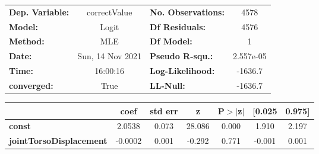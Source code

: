 \begin{center}
\begin{tabular}{lclc}
\toprule
\textbf{Dep. Variable:}         &   correctValue   & \textbf{  No. Observations:  } &     4578    \\
\textbf{Model:}                 &      Logit       & \textbf{  Df Residuals:      } &     4576    \\
\textbf{Method:}                &       MLE        & \textbf{  Df Model:          } &        1    \\
\textbf{Date:}                  & Sun, 14 Nov 2021 & \textbf{  Pseudo R-squ.:     } & 2.557e-05   \\
\textbf{Time:}                  &     16:00:16     & \textbf{  Log-Likelihood:    } &   -1636.7   \\
\textbf{converged:}             &       True       & \textbf{  LL-Null:           } &   -1636.7   \\
\bottomrule
\end{tabular}
\begin{tabular}{lcccccc}
                                & \textbf{coef} & \textbf{std err} & \textbf{z} & \textbf{P$> |$z$|$} & \textbf{[0.025} & \textbf{0.975]}  \\
\midrule
\textbf{const}                  &       2.0538  &        0.073     &    28.086  &         0.000        &        1.910    &        2.197     \\
\textbf{jointTorsoDisplacement} &      -0.0002  &        0.001     &    -0.292  &         0.771        &       -0.001    &        0.001     \\
\bottomrule
\end{tabular}
\end{center}